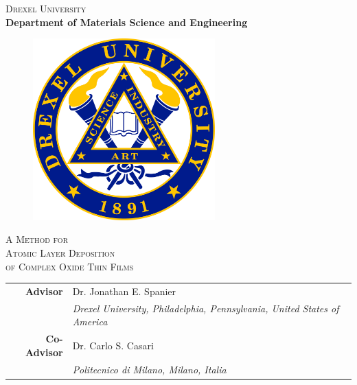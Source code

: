 \begin{titlepage}
\vspace*{-3.5cm}
\begin{center}
  {\Huge
  \textsc{Drexel University}\\
  \vspace{0.5em}
  \textbf{\Large
  Department of Materials Science and Engineering}}\\
  \begin{figure}[htbp]
    \begin{center}
      \includegraphics[width=7cm]{./pictures/drexelseal-color.jpg}
    \end{center}
  \end{figure}
  \vspace{-0.5cm}
   {\huge\textsc{
  A Method for\\
  Atomic Layer Deposition\\
  of Complex Oxide Thin Films\\
  }}

  
  
\end{center}
\large
\begin{centering}

\begin{tabular*}{0.75\textwidth}{>{\bfseries}r l}
  Advisor & Dr. Jonathan E. Spanier \\
  & \emph{\tiny Drexel University, Philadelphia, Pennsylvania, United States of America}\\
  Co-Advisor  & Dr. Carlo S. Casari \\
  & \emph{\tiny Politecnico di Milano, Milano, Italia}
  \vspace{0.3cm}
\end{tabular*}


\end{centering}
\end{titlepage}
